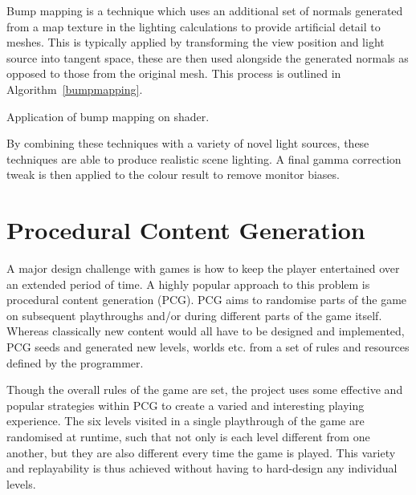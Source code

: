 \documentclass[a4paper, oneside, 11pt]{report}
\begin{document}
Bump mapping is a technique which uses an additional set of normals generated from a map texture in the lighting calculations to provide artificial detail to meshes. This is typically applied  by transforming the view position and light source into tangent space, these are then used alongside the generated normals as opposed to those from the original mesh. This process is outlined in Algorithm~\ref{bumpmapping}.

\begin{algorithm}[H]
    \begin{algorithmic}[1]
            \ENDFOR
        \ENDFOR
    \end{algorithmic}
\caption{Application of bump mapping on shader.}\label{bumpmapping}
\end{algorithm}

By combining these techniques with a variety of novel light sources, these techniques are able to produce realistic scene lighting. A final gamma correction tweak is then applied to the colour result to remove monitor biases.

\section{Procedural Content Generation}
A major design challenge with games is how to keep the player entertained over an extended period of time. A highly popular approach to this problem is procedural content generation (PCG). PCG aims to randomise parts of the game on subsequent playthroughs and/or during different parts of the game itself. Whereas classically new content would all have to be designed and implemented, PCG seeds and generated new levels, worlds etc. from a set of rules and resources defined by the programmer.

Though the overall rules of the game are set, the project uses some effective and popular strategies within PCG to create a varied and interesting playing experience. The six levels visited in a single playthrough of the game are randomised at runtime, such that not only is each level different from one another, but they are also different every time the game is played. This variety and replayability is thus achieved without having to hard-design any individual levels.
\end{document}
